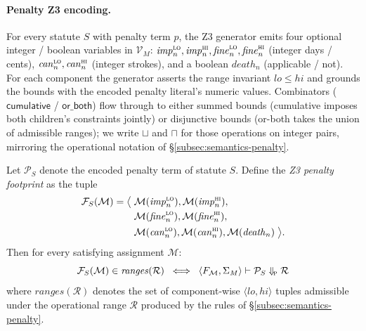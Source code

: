 \paragraph{Penalty Z3 encoding.} For every statute $S$ with
penalty term $p$, the Z3 generator emits four optional
integer / boolean variables in $\mathcal{V}_M$:
$\mathit{imp}_n^{\textsc{lo}}, \mathit{imp}_n^{\textsc{hi}},
\mathit{fine}_n^{\textsc{lo}}, \mathit{fine}_n^{\textsc{hi}}$
(integer days / cents),
$\mathit{can}_n^{\textsc{lo}}, \mathit{can}_n^{\textsc{hi}}$
(integer strokes), and a boolean $\mathit{death}_n$
(applicable / not). For each component the generator asserts
the range invariant
$\mathit{lo} \le \mathit{hi}$ and grounds the bounds with the
encoded penalty literal's numeric values. Combinators
($\textsf{cumulative}$ / $\textsf{or\_both}$) flow through to
either summed bounds (cumulative imposes both children's
constraints jointly) or disjunctive bounds (or-both takes the
union of admissible ranges); we write $\sqcup$ and $\sqcap$ for
those operations on integer pairs, mirroring the operational
notation of \S\ref{subsec:semantics-penalty}.

\begin{lemma}
\label{lem:soundness-penalty}
Let $\mathcal{P}_S$ denote the encoded penalty term of statute
$S$. Define the \emph{Z3 penalty footprint} as the tuple
{\scriptsize
\begin{align*}
\mathcal{F}_S(\mathcal{M}) = \big\langle\;
  &\mathcal{M}(\mathit{imp}_n^{\textsc{lo}}),
  \mathcal{M}(\mathit{imp}_n^{\textsc{hi}}), \\
  &\mathcal{M}(\mathit{fine}_n^{\textsc{lo}}),
  \mathcal{M}(\mathit{fine}_n^{\textsc{hi}}), \\
  &\mathcal{M}(\mathit{can}_n^{\textsc{lo}}),
  \mathcal{M}(\mathit{can}_n^{\textsc{hi}}),
  \mathcal{M}(\mathit{death}_n)\;\big\rangle.
\end{align*}}%
Then for every satisfying assignment $\mathcal{M}$:
\[
  \mathcal{F}_S(\mathcal{M}) \in \mathit{ranges}(\mathcal{R})
  \;\;\Longleftrightarrow\;\;
  \langle F_\mathcal{M}, \Sigma_M \rangle \vdash \mathcal{P}_S
  \Downarrow_{\!\textsc{p}} \mathcal{R}
\]
where $\mathit{ranges}(\mathcal{R})$ denotes the set of
component-wise $\langle \mathit{lo}, \mathit{hi} \rangle$ tuples
admissible under the operational range $\mathcal{R}$ produced by
the rules of \S\ref{subsec:semantics-penalty}.
\end{lemma}

